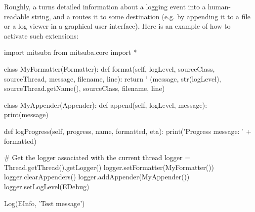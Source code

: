 Roughly, a  turns detailed
information about a logging event into a human-readable string, and a
 routes it to some destination (e.g. by appending it to
a file or a log viewer in a graphical user interface). Here is an example
of how to activate such extensions:
\begin{python}
import mitsuba
from mitsuba.core import *

class MyFormatter(Formatter):
    def format(self, logLevel, sourceClass, sourceThread, message, filename, line):
        return '%
                (message, str(logLevel), sourceThread.getName(), sourceClass,
                 filename, line)

class MyAppender(Appender):
    def append(self, logLevel, message):
        print(message)

    def logProgress(self, progress, name, formatted, eta):
        print('Progress message: ' + formatted)

# Get the logger associated with the current thread
logger = Thread.getThread().getLogger()
logger.setFormatter(MyFormatter())
logger.clearAppenders()
logger.addAppender(MyAppender())
logger.setLogLevel(EDebug)

Log(EInfo, 'Test message')
\end{python}
